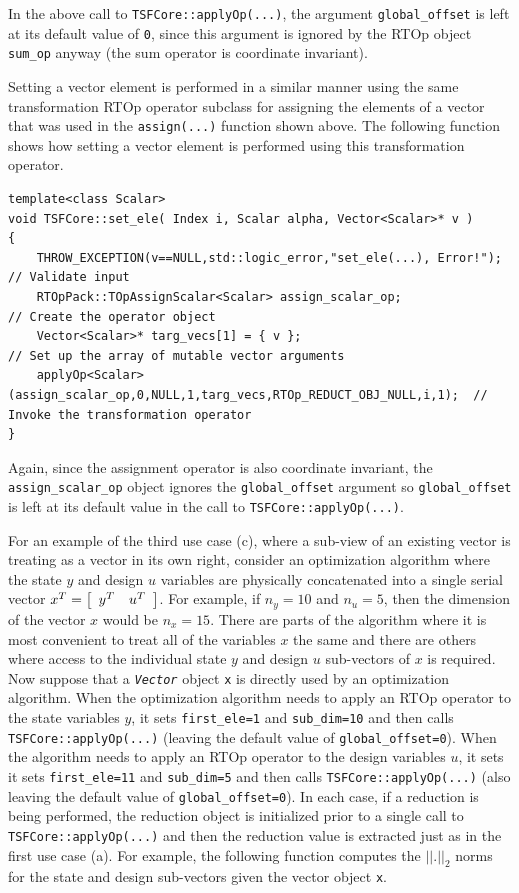 In the above call to \texttt{TSFCore::applyOp(\-...)}, the argument
\texttt{global\_offset} is left at its default value of \texttt{0},
since this argument is ignored by the RTOp object \texttt{sum\_op}
anyway (the sum operator is coordinate invariant).

Setting a vector element is performed in a similar manner using the
same transformation RTOp operator subclass for assigning the elements
of a vector that was used in the \texttt{assign(...)} function shown
above.  The following function shows how setting a vector element
is performed using this transformation operator.

{\tiny\begin{verbatim}
template<class Scalar>
void TSFCore::set_ele( Index i, Scalar alpha, Vector<Scalar>* v )
{
    THROW_EXCEPTION(v==NULL,std::logic_error,"set_ele(...), Error!");               // Validate input
    RTOpPack::TOpAssignScalar<Scalar> assign_scalar_op;                             // Create the operator object
    Vector<Scalar>* targ_vecs[1] = { v };                                           // Set up the array of mutable vector arguments
    applyOp<Scalar>(assign_scalar_op,0,NULL,1,targ_vecs,RTOp_REDUCT_OBJ_NULL,i,1);  // Invoke the transformation operator
}
\end{verbatim}}

Again, since the assignment operator is also coordinate invariant, the
\texttt{assign\_scalar\_op} object ignores the \texttt{global\_offset}
argument so \texttt{global\_offset} is left at its default value in
the call to \texttt{TSFCore::applyOp(\-...)}.

For an example of the third use case (c), where a sub-view of an
existing vector is treating as a vector in its own right, consider an
optimization algorithm where the state $y$ and design $u$ variables
are physically concatenated into a single serial vector $x^T =
{\bmat{cc} y^T & u^T \emat}$.  For example, if $n_y = 10$ and $n_u =
5$, then the dimension of the vector $x$ would be $n_x = 15$.  There
are parts of the algorithm where it is most convenient to treat all of
the variables $x$ the same and there are others where access to the
individual state $y$ and design $u$ sub-vectors of $x$ is required.
Now suppose that a \texttt{\textit{Vector}} object \texttt{x} is
directly used by an optimization algorithm.  When the optimization
algorithm needs to apply an RTOp operator to the state variables $y$, it
sets \texttt{first\_ele=1} and \texttt{sub\_dim=10} and then calls
\texttt{TSFCore::applyOp(\-...)} (leaving the default value of
\texttt{global\_offset=0}).  When the algorithm needs to apply an
RTOp operator to the design variables $u$, it sets it sets
\texttt{first\_ele=11} and \texttt{sub\_dim=5} and then calls
\texttt{TSFCore::applyOp(\-...)} (also leaving the default value of
\texttt{global\_offset=0}).  In each case, if a reduction is being performed,
the reduction object is initialized prior to a single call to
\texttt{TSFCore::applyOp(\-...)} and then the reduction value is extracted
just as in the first use case (a).  For example, the following
function computes the $||.||_2$ norms for the state and design
sub-vectors given the vector object \texttt{x}.

